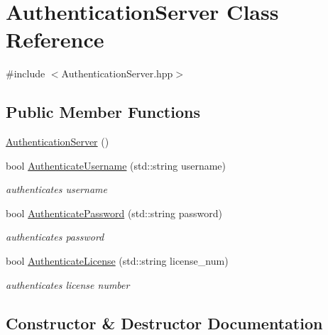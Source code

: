 \hypertarget{class_authentication_server}{}\section{Authentication\+Server Class Reference}
\label{class_authentication_server}


{\ttfamily \#include $<$Authentication\+Server.\+hpp$>$}

\subsection*{Public Member Functions}
\begin{DoxyCompactItemize}
\item 
\mbox{\hyperlink{class_authentication_server_ad8326d979c9a9a029704a2085d15187a}{Authentication\+Server}} ()
\item 
bool \mbox{\hyperlink{class_authentication_server_a5248d41a54e50539c351b36bf2a2fd64}{Authenticate\+Username}} (std\+::string username)
\begin{DoxyCompactList}\small\item\em authenticates username \end{DoxyCompactList}\item 
bool \mbox{\hyperlink{class_authentication_server_a74f3ddb8d8a5dfc7840cae076c4971be}{Authenticate\+Password}} (std\+::string password)
\begin{DoxyCompactList}\small\item\em authenticates password \end{DoxyCompactList}\item 
bool \mbox{\hyperlink{class_authentication_server_ad96db98d33cb55cb6ff720218064a447}{Authenticate\+License}} (std\+::string license\+\_\+num)
\begin{DoxyCompactList}\small\item\em authenticates license number \end{DoxyCompactList}\end{DoxyCompactItemize}


\subsection{Constructor \& Destructor Documentation}
\mbox{\label{class_authentication_server_ad8326d979c9a9a029704a2085d15187a}} 
